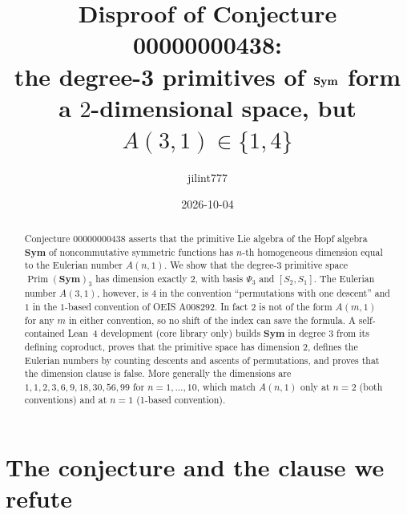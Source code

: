 \documentclass[11pt]{article}
\title{Disproof of Conjecture 00000000438:\\
the degree-3 primitives of $\NSym$ form a $2$-dimensional space, but $A(3,1)\in\{1,4\}$}
\author{jilint777}
\date{2026-10-04}
\theoremstyle{remark}
\newcommand{\NSym}{\mathbf{Sym}}
\newcommand{\Prim}{\operatorname{Prim}}
\begin{document}
\sloppy
\maketitle

\begin{abstract}
Conjecture 00000000438 asserts that the primitive Lie algebra of the Hopf
algebra $\NSym$ of noncommutative symmetric functions has $n$-th homogeneous
dimension equal to the Eulerian number $A(n,1)$. We show that the degree-$3$
primitive space $\Prim(\NSym)_3$ has dimension exactly $2$, with basis
$\Psi_3$ and $[S_2,S_1]$. The Eulerian number $A(3,1)$, however, is $4$ in the
convention ``permutations with one descent'' and $1$ in the $1$-based
convention of OEIS A008292. In fact $2$ is not of the form $A(m,1)$ for any
$m$ in either convention, so no shift of the index can save the
formula. A self-contained Lean~4 development (core library only) builds
$\NSym$ in degree $3$ from its defining coproduct, proves that the primitive space
has dimension $2$, defines the Eulerian numbers by counting descents and
ascents of permutations, and proves that the dimension clause is false. More
generally the dimensions are $1,1,2,3,6,9,18,30,56,99$ for $n=1,\dots,10$, which
match $A(n,1)$ only at $n=2$ (both conventions) and at $n=1$ (1-based convention).
\end{abstract}

\section{The conjecture and the clause we refute}
\end{document}
